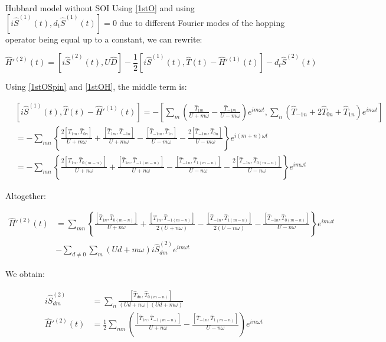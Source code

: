 \begin{section}{Hubbard model without SOI}
Using \ref{1stO} and using $\left[ i\hat{S}^{(1)}(t), d_t\hat{S}^{(1)}(t)\right] = 0$ due to different Fourier modes of the hopping operator being equal up to a constant, we can rewrite:

\begin{equation}
\hat{H}'^{(2)}(t) = \left[i\hat{S}^{(2)}(t), U \hat{D} \right] - \frac{1}{2}\left[ i\hat{S}^{(1)}(t), \hat{T}(t) - \hat{H}'^{(1)}(t)\right] - d_t\hat{S}^{(2)}(t)
\end{equation}

Using \ref{1stOSpin} and \ref{1stOH}, the middle term is:

\begin{align*}
&\left[ i\hat{S}^{(1)}(t), \hat{T}(t) - \hat{H}'^{(1)}(t)\right] = -\left[\sum_m \left( \frac{\hat{T}_{1m}}{U+m\omega} - \frac{\hat{T}_{-1m}}{U-m\omega} \right)e^{im \omega t}, \sum_n \left( \hat{T}_{-1n} + 2\hat{T}_{0n} + \hat{T}_{1n} \right) e^{in\omega t} \right] \\
&= -\sum_{mn} \left\{ \frac{2\left[\hat{T}_{1m}, \hat{T}_{0n} \right]}{U+m\omega} + \frac{\left[\hat{T}_{1m}, \hat{T}_{-1n} \right]}{U+m\omega} - \frac{\left[\hat{T}_{-1m}, \hat{T}_{1n} \right]}{U-m\omega} - \frac{2\left[\hat{T}_{-1m}, \hat{T}_{0n} \right]}{U-m\omega} \right\} e^{i(m+n)\omega t} \\
&= -\sum_{mn} \left\{ \frac{2\left[\hat{T}_{1n}, \hat{T}_{0(m-n)} \right]}{U+n\omega} + \frac{\left[\hat{T}_{1n}, \hat{T}_{-1(m-n)} \right]}{U+n\omega} - \frac{\left[\hat{T}_{-1n}, \hat{T}_{1(m-n)} \right]}{U-n\omega} - \frac{2\left[\hat{T}_{-1n}, \hat{T}_{0(m-n)} \right]}{U-n\omega} \right\} e^{im\omega t}
\end{align*}

Altogether:

\begin{align*}
\hat{H}'^{(2)}(t) &= \sum_{mn} \left\{ \frac{\left[\hat{T}_{1n}, \hat{T}_{0(m-n)} \right]}{U+n\omega} + \frac{\left[\hat{T}_{1n}, \hat{T}_{-1(m-n)} \right]}{2(U+n\omega)} - \frac{\left[\hat{T}_{-1n}, \hat{T}_{1(m-n)} \right]}{2(U-n\omega)} - \frac{\left[\hat{T}_{-1n}, \hat{T}_{0(m-n)} \right]}{U-n\omega} \right\} e^{im\omega t} \\
&-\sum_{d\neq 0}\sum_m (Ud+m\omega) i\hat{S}^{(2)}_{dm} e^{im\omega t}
\end{align*}

We obtain:

\begin{align}
i\hat{S}^{(2)}_{dm} &= \sum_n \frac{\left[ \hat{T}_{dn}, \hat{T}_{0(m-n)} \right]}{(Ud+n\omega)(Ud+m\omega)} \label{2ndOSpin}\\
\hat{H}'^{(2)}(t) &= \frac{1}{2}\sum_{mn} \left( \frac{\left[\hat{T}_{1n}, \hat{T}_{-1(m-n)} \right]}{U+n\omega} - \frac{\left[\hat{T}_{-1n}, \hat{T}_{1(m-n)} \right]}{U-n\omega} \right) e^{im\omega t} \label{2ndOH}
\end{align}


\end{section}
